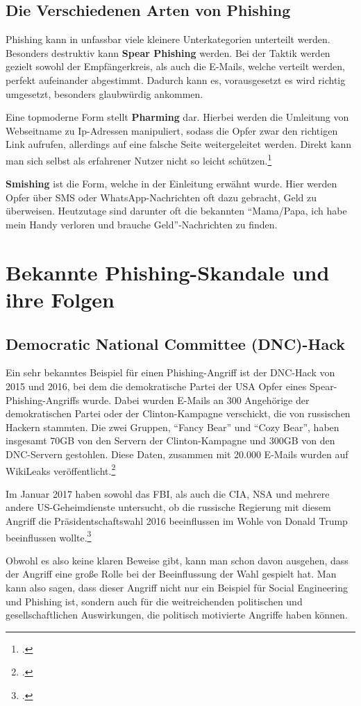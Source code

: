 \documentclass[12pt, a4paper, oneside]{scrartcl}
\begin{document}
\subsection{Die Verschiedenen Arten von Phishing}
Phishing kann in unfassbar viele kleinere Unterkategorien unterteilt werden. Besonders destruktiv kann
\textbf{Spear Phishing} werden. Bei der Taktik werden gezielt sowohl der Empfängerkreis, als auch die E-Mails,
welche verteilt werden, perfekt aufeinander abgestimmt. Dadurch kann es, vorausgesetzt es wird richtig
umgesetzt, besonders glaubwürdig ankommen.
\par
Eine topmoderne Form stellt \textbf{Pharming} dar. Hierbei werden die Umleitung von Webseitname zu 
Ip-Adressen manipuliert, sodass die Opfer zwar den richtigen Link aufrufen, allerdings auf eine falsche
Seite weitergeleitet werden. Direkt kann man sich selbst als erfahrener Nutzer nicht so leicht schützen.\footcite{Bayern_Phaming}
\par
\textbf{Smishing} ist die Form, welche in der Einleitung erwähnt wurde. Hier werden Opfer über SMS oder
WhatsApp-Nachrichten oft dazu gebracht, Geld zu überweisen. Heutzutage sind darunter oft die bekannten 
``Mama/Papa, ich habe mein Handy verloren und brauche Geld''-Nachrichten zu finden.\\

\section{Bekannte Phishing-Skandale und ihre Folgen}

\subsection{Democratic National Committee (DNC)-Hack}
Ein sehr bekanntes Beispiel für einen Phishing-Angriff ist der DNC-Hack von 2015 und 2016, 
bei dem die demokratische Partei der USA Opfer eines Spear-Phishing-Angriffs wurde. 
Dabei wurden E-Mails an 300 Angehörige der demokratischen Partei oder der Clinton-Kampagne
verschickt, die von russischen Hackern stammten. Die zwei Gruppen, ``Fancy Bear'' und ``Cozy Bear'',
haben insgesamt 70GB von den Servern der Clinton-Kampagne und 300GB von den DNC-Servern gestohlen.
Diese Daten, zusammen mit 20.000 E-Mails wurden auf WikiLeaks veröffentlicht.\footcite{IDStrong_DNC}
\par
Im Januar 2017 haben sowohl das FBI, als auch die CIA, NSA und mehrere andere US-Geheimdienste
untersucht, ob die russische Regierung mit diesem Angriff die Präsidentschaftswahl 2016 beeinflussen 
im Wohle von Donald Trump beeinflussen wollte.\footcite{NYT_DNC}
\par
Obwohl es also keine klaren Beweise gibt, kann man schon davon ausgehen, dass der Angriff eine 
große Rolle bei der Beeinflussung der Wahl gespielt hat. Man kann also sagen, dass dieser Angriff 
nicht nur ein Beispiel für Social Engineering und Phishing ist, sondern auch für die weitreichenden 
politischen und gesellschaftlichen Auswirkungen, die politisch motivierte Angriffe haben können.
\end{document}
